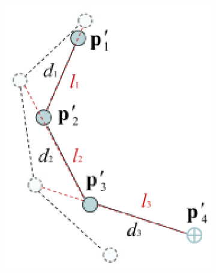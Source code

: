 \begin{figure}
\begin{subfigure}{0.2\textwidth}
        \includegraphics[width=\linewidth]{grafika/fabrik_iteration4.eps}
        \subcaption{}
        \label{fig:fabrik4}
    \end{subfigure}
    \begin{subfigure}{0.2\textwidth}
        \centering

\end{subfigure}
\end{figure}
